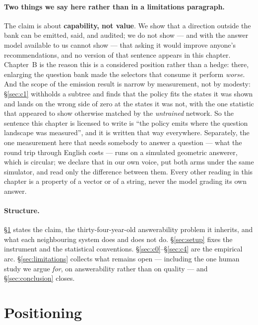 \documentclass[11pt]{article}
\begin{document}
\paragraph{Two things we say here rather than in a limitations paragraph.} The claim is about
\textbf{capability, not value}. We show that a direction outside the bank can be emitted, said, and
audited; we do not show --- and with the answer model available to us cannot show --- that asking it
would improve anyone's recommendations, and no version of that sentence appears in this chapter.
Chapter~B is the reason this is a considered position rather than a hedge: there, enlarging the
question bank made the selectors that consume it perform \emph{worse}. And the scope of the emission
result is narrow by measurement, not by modesty: \S\ref{sec:c1} withholds a subtree and finds that
the policy fits the states it was shown and lands on the wrong side of zero at the states it was
not, with the one statistic that appeared to show otherwise matched by the \emph{untrained} network.
So the sentence this chapter is licensed to write is ``the policy emits where the question landscape
was measured'', and it is written that way everywhere. Separately, the one measurement here that
needs somebody to answer a question --- what the round trip through English costs --- runs on a
simulated geometric answerer, which is circular; we declare that in our own voice, put both arms
under the same simulator, and read only the difference between them. Every other reading in this
chapter is a property of a vector or of a string, never the model grading its own answer.

\paragraph{Structure.} \S\ref{sec:positioning} states the claim, the thirty-four-year-old
answerability problem it inherits, and what each neighbouring system does and does not do.
\S\ref{sec:setup} fixes the instrument and the statistical conventions. \S\ref{sec:c0}--\S\ref{sec:c4}
are the empirical arc. \S\ref{sec:limitations} collects what remains open --- including the one
human study we argue \emph{for}, on answerability rather than on quality --- and \S\ref{sec:conclusion}
closes.

\section{Positioning}
\label{sec:positioning}
\end{document}
